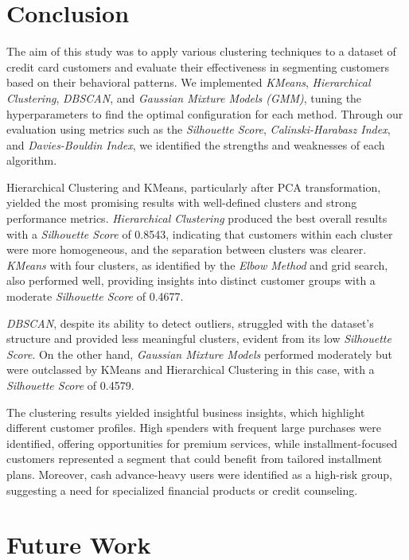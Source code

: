 \documentclass[runningheads,a4paper]{llncs}
\begin{document}
\section{Conclusion}

The aim of this study was to apply various clustering techniques to a dataset of credit card customers and evaluate their effectiveness in segmenting customers based on their behavioral patterns. We implemented \textit{KMeans}, \textit{Hierarchical Clustering}, \textit{DBSCAN}, and \textit{Gaussian Mixture Models (GMM)}, tuning the hyperparameters to find the optimal configuration for each method. Through our evaluation using metrics such as the \textit{Silhouette Score}, \textit{Calinski-Harabasz Index}, and \textit{Davies-Bouldin Index}, we identified the strengths and weaknesses of each algorithm.

Hierarchical Clustering and KMeans, particularly after PCA transformation, yielded the most promising results with well-defined clusters and strong performance metrics. \textit{Hierarchical Clustering} produced the best overall results with a \textit{Silhouette Score} of 0.8543, indicating that customers within each cluster were more homogeneous, and the separation between clusters was clearer. \textit{KMeans} with four clusters, as identified by the \textit{Elbow Method} and grid search, also performed well, providing insights into distinct customer groups with a moderate \textit{Silhouette Score} of 0.4677.

\textit{DBSCAN}, despite its ability to detect outliers, struggled with the dataset's structure and provided less meaningful clusters, evident from its low \textit{Silhouette Score}. On the other hand, \textit{Gaussian Mixture Models} performed moderately but were outclassed by KMeans and Hierarchical Clustering in this case, with a \textit{Silhouette Score} of 0.4579.

The clustering results yielded insightful business insights, which highlight different customer profiles. High spenders with frequent large purchases were identified, offering opportunities for premium services, while installment-focused customers represented a segment that could benefit from tailored installment plans. Moreover, cash advance-heavy users were identified as a high-risk group, suggesting a need for specialized financial products or credit counseling.

\section{Future Work}
\end{document}
